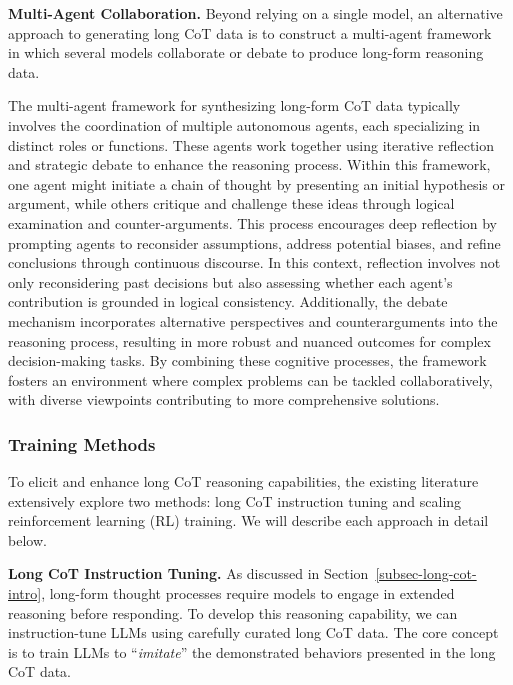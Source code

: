 \textbf{Multi-Agent Collaboration.} Beyond relying on a single model, an alternative approach to generating long CoT data is to construct a multi-agent framework~\cite{Liang-arxiv-2023-Encouraging} in which several models collaborate or debate to produce long-form reasoning data. 

The multi-agent framework for synthesizing long-form CoT data typically involves the coordination of multiple autonomous agents, each specializing in distinct roles or functions. These agents work together using iterative reflection and strategic debate to enhance the reasoning process. Within this framework, one agent might initiate a chain of thought by presenting an initial hypothesis or argument, while others critique and challenge these ideas through logical examination and counter-arguments. This process encourages deep reflection by prompting agents to reconsider assumptions, address potential biases, and refine conclusions through continuous discourse. In this context, reflection involves not only reconsidering past decisions but also assessing whether each agent's contribution is grounded in logical consistency. Additionally, the debate mechanism incorporates alternative perspectives and counterarguments into the reasoning process, resulting in more robust and nuanced outcomes for complex decision-making tasks. By combining these cognitive processes, the framework fosters an environment where complex problems can be tackled collaboratively, with diverse viewpoints contributing to more comprehensive solutions.

\subsubsection{Training Methods}\label{subsec-long-cot-training}
To elicit and enhance long CoT reasoning capabilities, the existing literature extensively explore two methods: long CoT instruction tuning and scaling reinforcement learning (RL) training. We will describe each approach in detail below.

\textbf{Long CoT Instruction Tuning.} As discussed in Section~\ref{subsec-long-cot-intro}, long-form thought processes require models to engage in extended reasoning before responding. To develop this reasoning capability, we can instruction-tune LLMs using carefully curated long CoT data. The core concept is to train LLMs to ``\emph{imitate}'' the demonstrated behaviors presented in the long CoT data.

